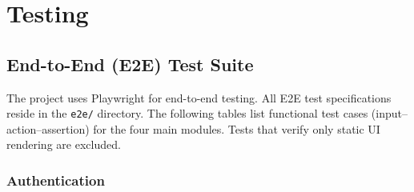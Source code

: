 \documentclass[12pt,a4paper]{article}
\begin{document}
\section{Testing}

\subsection{End-to-End (E2E) Test Suite}

The project uses Playwright for end-to-end testing. All E2E test specifications reside in the \texttt{e2e/} directory. The following tables list functional test cases (input--action--assertion) for the four main modules. Tests that verify only static UI rendering are excluded.

\subsubsection{Authentication}
\end{document}
